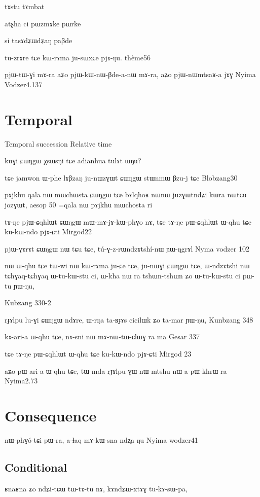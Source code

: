 \documentclass[oldfontcommands,oneside,a4paper,11pt]{memoir}
\begin{document}
tɤstu tɤmbat

atʂha ci pɯzmɤke pɯrke


si tasɤdʑɯdʑaŋ paβde


tu-zrɤre tɕe kɯ-rɤma ju-sɯxɕe pjɤ-ŋu.
thème56

pjɯ-tɯ-ɣi mɤ-ra
aʑo pjɯ-kɯ-nɯ-βde-a-nɯ mɤ-ra, aʑo pjɯ-nɯmtsaʁ-a jɤɣ
Nyima Vodzer4.137

\section{Temporal}

Temporal succession
Relative time

kuɣi ɕɯŋgɯ χsɯsŋi tɕe adianhua tulɤt ɯŋu?


tɕe jamwon ɯ-phe lɤβzaŋ ju-nɯzɣɯt ɕɯŋgɯ stɯnmɯ βzu-j tɕe
Blobzang30

pɤjkhu qala nɯ mɯchɯsta ɕɯŋgɯ tɕe bɤlqhoʁ nɯnɯ juzɣɯtndʑi kɯra nɯtɕu jozɣɯt, aesop 50 =qala nɯ pɤjkhu mɯchosta ri

tɤ-ŋe	pjɯ-ɕqhlɯt	ɕɯŋgɯ	mɯ-mɤ-jɤ-kɯ-phɣo	nɤ, tɕe	tɤ-ŋe	pɯ-ɕqhlɯt	ɯ-qhu	tɕe	ku-kɯ-ndo	pjɤ-ɕti
Mirgod22

pjɯ-ɣɤrɤt	ɕɯŋgɯ	nɯ	tɕu	tɕe,	tú-ɣ-z-rɯndzɤtshí-nɯ	ɲɯ-ŋgrɤl	
Nyma vodzer 102


nɯ	ɯ-qhu	tɕe	tɯ-wi	nɯ	kɯ-rɤma	ju-ɕe	tɕe,	ju-nɯɣi	ɕɯŋgɯ	tɕe,
	ɯ-ndzɤtshi	nɯ	tɕhɣaq-tɕhɣaq	ɯ-tu-kɯ-stu	ci,
ɯ-kha	nɯ	ra	tshɯn-tshɯn	ʑo	ɯ-tu-kɯ-stu	ci	pɯ-tu	ɲɯ-ŋu,


Kubzang 330-2


rɟɤlpu	lu-ɣi	ɕɯŋgɯ	ndɤre,	ɯ-rŋa	ta-ʁɟɤs	cicilɯk	ʑo	ta-mar	ɲɯ-ŋu,
Kunbzang 348


	kɤ-ari-a	ɯ-qhu	tɕe,	nɤ-sni	nɯ	mɤ-nɯ-tɯ-ɕlɯɣ	ra	ma
Gesar 337

tɕe	tɤ-ŋe	pɯ-ɕqhlɯt	ɯ-qhu	tɕe	ku-kɯ-ndo	pjɤ-ɕti
Mirgod 23

aʑo	pɯ-ari-a	ɯ-qhu	tɕe,	tɯ-mda	rɟɤlpu	ɣɯ	nɯ-mtshu	nɯ	a-pɯ-khrɯ	ra
Nyima2.73
\section{Consequence}

nɯ-phɣó-tɕi	pɯ-ra, a-ɬaq	mɤ-kɯ-sna	ndʐa	ŋu
Nyima wodzer41

\subsection{Conditional}

ʁnaʁna ʑo ndʑi-tɕɯ tɯ-tɤ-tu nɤ, kɤndʑɯ-xtɤɣ tu-kɤ-sɯ-pa,
\end{document}
